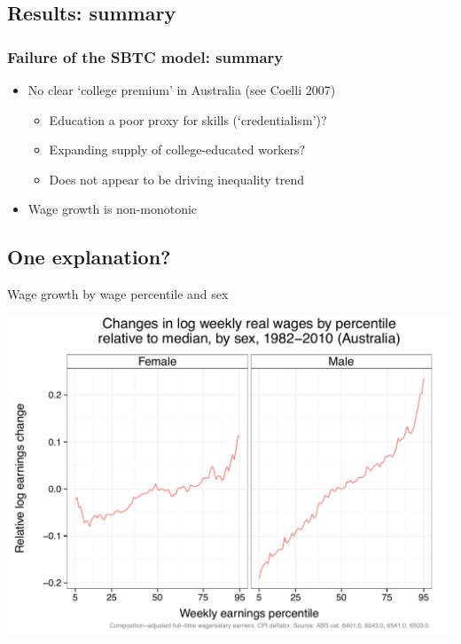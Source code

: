 \documentclass[red]{beamer}
\newcommand{\vitem}{\vfill\item}
\begin{document}
\subsection{Results: summary}
\begin{frame}
  \frametitle{Failure of the SBTC model: summary}
  \begin{itemize}
  \vitem No clear `college premium' in Australia (see Coelli 2007)
  \begin{itemize}
  \vitem Education a poor proxy for skills (`credentialism')?
  \vitem Expanding supply of college-educated workers?
  \vitem Does not appear to be driving inequality trend
  \end{itemize}
  \pause
  \vitem Wage growth is non-monotonic
  \end{itemize}
\end{frame}

\subsection{One explanation?}
\begin{frame}{Wage growth by wage percentile and sex}
  \begin{center}
    \includegraphics[width=\textwidth]{slides_fig/quantile_growth_mf.pdf}
  \end{center}
\end{frame}
\end{document}
